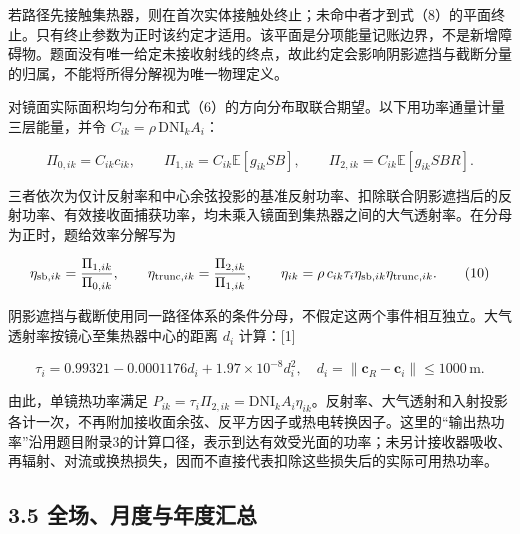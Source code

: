 \documentclass[UTF8,fontset=windows,zihao=-4]{ctexart}
\begin{document}
若路径先接触集热器，则在首次实体接触处终止；未命中者才到式（8）的平面终止。只有终止参数为正时该约定才适用。该平面是分项能量记账边界，不是新增障碍物。题面没有唯一给定未接收射线的终点，故此约定会影响阴影遮挡与截断分量的归属，不能将所得分解视为唯一物理定义。

\par\noindent\begin{minipage}{\linewidth}
对镜面实际面积均匀分布和式（6）的方向分布取联合期望。以下用功率通量计量三层能量，并令 \(C_{ik}=\rho\,\mathrm{DNI}_k A_i\)：

\[
\Pi_{0,ik}=C_{ik}c_{ik},\qquad
\Pi_{1,ik}=C_{ik}\mathbb E[g_{ik}SB],\qquad
\Pi_{2,ik}=C_{ik}\mathbb E[g_{ik}SBR].
\tag{9}
\]
\end{minipage}\par

\par\noindent\begin{minipage}{\linewidth}
三者依次为仅计反射率和中心余弦投影的基准反射功率、扣除联合阴影遮挡后的反射功率、有效接收面捕获功率，均未乘入镜面到集热器之间的大气透射率。在分母为正时，题给效率分解写为

\[
\eta_{{\rm sb},ik}=\frac{\Pi_{1,ik}}{\Pi_{0,ik}},\qquad
\eta_{{\rm trunc},ik}=\frac{\Pi_{2,ik}}{\Pi_{1,ik}},\qquad
\eta_{ik}=\rho\,c_{ik}\tau_i\eta_{{\rm sb},ik}\eta_{{\rm trunc},ik}.
\tag{10}
\]
\end{minipage}\par

\par\noindent\begin{minipage}{\linewidth}
阴影遮挡与截断使用同一路径体系的条件分母，不假定这两个事件相互独立。大气透射率按镜心至集热器中心的距离 \(d_i\) 计算：[1]

\[
\tau_i=0.99321-0.0001176d_i+1.97\times10^{-8}d_i^2,
\quad d_i=\|\boldsymbol c_R-\boldsymbol c_i\|\le1000\,\mathrm m.
\tag{11}
\]
\end{minipage}\par

由此，单镜热功率满足 \(P_{ik}=\tau_i\Pi_{2,ik}=\mathrm{DNI}_kA_i\eta_{ik}\)。反射率、大气透射和入射投影各计一次，不再附加接收面余弦、反平方因子或热电转换因子。这里的“输出热功率”沿用题目附录3的计算口径，表示到达有效受光面的功率；未另计接收器吸收、再辐射、对流或换热损失，因而不直接代表扣除这些损失后的实际可用热功率。

\subsection*{3.5 全场、月度与年度汇总}
\end{document}
